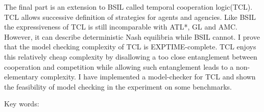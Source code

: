 \begin{abstractEN}
The final part is an extension to BSIL called temporal cooperation logic(TCL). TCL allows successive definition of strategies for agents and agencies. Like BSIL the expressiveness of TCL is still incomparable with ATL*, GL and AMC. However, it can describe deterministic Nash equilibria while BSIL cannot. I prove that the model checking complexity of TCL is EXPTIME-complete. TCL enjoys this relatively cheap complexity by disallowing a too close entanglement between cooperation and competition while allowing such entanglement leads to a non-elementary complexity. I have implemented a model-checker for TCL and shown the feasibility of model checking in the experiment on some benchmarks.  


Key words:

\end{abstractEN}
